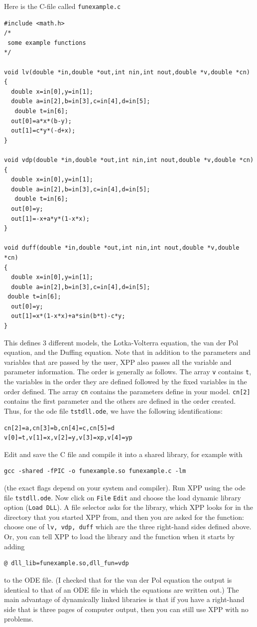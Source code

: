 \documentclass{article}
\begin{document}
Here is the C-file called {\tt funexample.c}
\begin{verbatim}
#include <math.h>
/*  
 some example functions
*/

void lv(double *in,double *out,int nin,int nout,double *v,double *cn)
{
  double x=in[0],y=in[1];
  double a=in[2],b=in[3],c=in[4],d=in[5];
   double t=in[6];
  out[0]=a*x*(b-y);
  out[1]=c*y*(-d+x);
}

void vdp(double *in,double *out,int nin,int nout,double *v,double *cn)
{
  double x=in[0],y=in[1];
  double a=in[2],b=in[3],c=in[4],d=in[5];
   double t=in[6];
  out[0]=y;
  out[1]=-x+a*y*(1-x*x);
}

void duff(double *in,double *out,int nin,int nout,double *v,double *cn)
{
  double x=in[0],y=in[1];
  double a=in[2],b=in[3],c=in[4],d=in[5];
 double t=in[6];
  out[0]=y;
  out[1]=x*(1-x*x)+a*sin(b*t)-c*y;
}
\end{verbatim}
This defines 3 different models, the Lotka-Volterra equation,
the van der Pol equation, and the Duffing equation. Note that in
addition to the parameters and variables that are passed by the user,
XPP also passes all the variable and parameter information. The order
is generally as follows. The array {\tt v} contains {\tt t},
the variables in the order they are defined followed by the fixed
variables in the order defined. The array {\tt cn} contains the
parameters define in your model. {\tt cn[2]} contains the first
parameter and the others are defined in the order created. Thus, for
the ode file {\tt tstdll.ode}, we have the following identifications:
\begin{verbatim}
cn[2]=a,cn[3]=b,cn[4]=c,cn[5]=d
v[0]=t,v[1]=x,v[2]=y,v[3]=xp,v[4]=yp
\end{verbatim}
  



Edit and save the C file and
compile it into a shared library, for example with
\begin{verbatim}
gcc -shared -fPIC -o funexample.so funexample.c -lm
\end{verbatim}
(the exact flags depend on your system and compiler).  Run XPP using the ode file
{\tt tstdll.ode}. Now click on {\tt File} {\tt Edit} and choose the
load dynamic library option ({\tt Load DLL}). A file selector asks for the library, which XPP looks for in the
directory that you started XPP from, and then you are asked for the
function: choose one of {\tt lv, vdp, duff} which are the three
right-hand sides defined above.  Or, you can tell XPP to load the library and the function when it starts by adding
\begin{verbatim}
@ dll_lib=funexample.so,dll_fun=vdp
\end{verbatim}
to the ODE file.  (I checked that for the van der Pol equation the output is identical to that of an ODE file in which
the equations are written out.)  The main advantage of dynamically
linked libraries is that if you have a right-hand side that is three
pages of computer output, then you can still use XPP with no
problems. 
\end{document}
